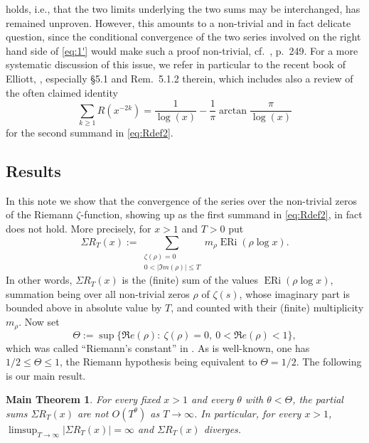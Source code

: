 \documentclass[a4paper,10pt]{amsart}
\DeclareMathOperator{\ERi}{ERi}
\newtheorem*{thm*}{Main Theorem}
\theoremstyle{definition}
\numberwithin{equation}{section}
\begin{document}
holds, i.e., that the two limits underlying the two sums may be interchanged, has remained unproven. However, this amounts to a non-trivial and in fact delicate question, since the conditional convergence of the two series involved on the right hand side of \eqref{eq:1'} would make such a proof non-trivial, cf.\ \cite{BorweinBradleyCrandall2000}, p.\ 249. For a more systematic discussion of this issue, we refer in particular to the recent book of Elliott, \cite{Elliott2025}, especially \S 5.1 and Rem.\ 5.1.2 therein, which includes also a review of the often claimed identity
\begin{equation}\label{eq:trivRs}
\sum_{k\geq 1} R(x^{-2k})=\frac{1}{\log(x)} - \frac{1}{\pi} \arctan{\frac{\pi}{\log(x)}} 
\end{equation}
for the second summand in  \eqref{eq:Rdef2}.


\subsection*{Results} In this note we show that the convergence of the series over the non-trivial zeros of the Riemann $\zeta$-function, showing up as the first summand in \eqref{eq:Rdef2}, in fact does not hold. More precisely, for $x>1$ and $T>0$ put
$$
\Sigma R_T(x):= \sum_{\substack{\zeta(\rho)=0\\0<|\Im m(\rho)|\le T}} m_\rho\ERi(\rho\log x).
$$
In other words, $\Sigma R_T(x)$ is the (finite) sum of the values $\ERi(\rho\log x)$, summation being over all non-trivial zeros $\rho$ of $\zeta(s)$, whose imaginary part is bounded above in absolute value by $T$, and counted with their (finite) multiplicity $m_\rho$. Now set 
$$\Theta:=\sup\{\Re e(\rho):\ \zeta(\rho)=0,\ 0<\Re e(\rho)<1\},$$
which was called ``Riemann's constant'' in  \cite{Elliott2025}. As is well-known, one has $1/2\leq\Theta\leq 1$, the Riemann hypothesis being equivalent to $\Theta=1/2$. The following is our main result.

\begin{thm*}\label{thm:main}
For every fixed $x>1$ and every $\theta$ with $\theta<\Theta$, the partial sums $\Sigma R_T(x)$ are not $O(T^\theta)$ as $T\to\infty$. In particular, for every $x>1$, $\limsup_{T\to\infty}|\Sigma R_T(x)|=\infty$ and $\Sigma R_T(x)$ diverges. 
\end{thm*}
\end{document}
